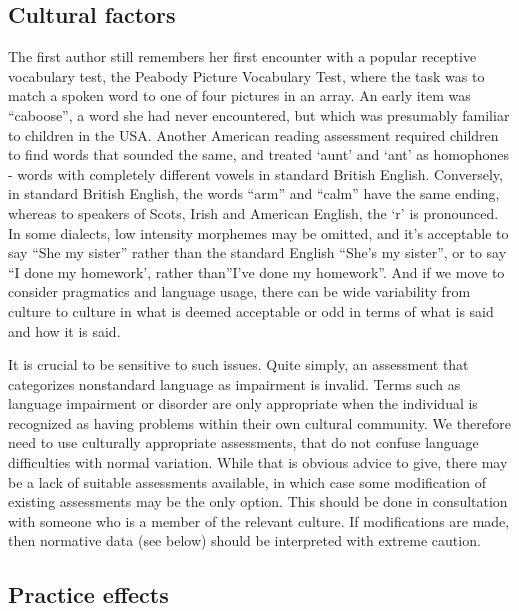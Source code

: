 \documentclass{krantz}
\begin{document}
\hypertarget{cultural-factors}{%
\subsection{Cultural factors}\label{cultural-factors}}

The first author still remembers her first encounter with a popular receptive vocabulary test, the Peabody Picture Vocabulary Test, where the task was to match a spoken word to one of four pictures in an array. An early item was ``caboose'', a word she had never encountered, but which was presumably familiar to children in the USA. Another American reading assessment required children to find words that sounded the same, and treated `aunt' and `ant' as homophones - words with completely different vowels in standard British English. Conversely, in standard British English, the words ``arm'' and ``calm'' have the same ending, whereas to speakers of Scots, Irish and American English, the `r' is pronounced. In some dialects, low intensity morphemes may be omitted, and it's acceptable to say ``She my sister'' rather than the standard English ``She's my sister'', or to say ``I done my homework', rather than''I've done my homework''. And if we move to consider pragmatics and language usage, there can be wide variability from culture to culture in what is deemed acceptable or odd in terms of what is said and how it is said.

It is crucial to be sensitive to such issues. Quite simply, an assessment that categorizes nonstandard language as impairment is invalid. Terms such as language impairment or disorder are only appropriate when the individual is recognized as having problems within their own cultural community. We therefore need to use culturally appropriate assessments, that do not confuse language difficulties with normal variation. While that is obvious advice to give, there may be a lack of suitable assessments available, in which case some modification of existing assessments may be the only option. This should be done in consultation with someone who is a member of the relevant culture. If modifications are made, then normative data (see below) should be interpreted with extreme caution.

\hypertarget{practice-effects}{%
\subsection{Practice effects}\label{practice-effects}}
\end{document}
